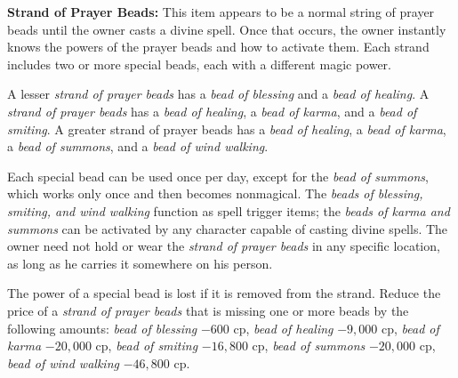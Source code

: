 \textbf{Strand of Prayer Beads:} This item appears to be a normal string of prayer beads until the owner casts a divine spell. Once that occurs, the owner instantly knows the powers of the prayer beads and how to activate them. Each strand includes two or more special beads, each with a different magic power.


A lesser \emph{strand of prayer beads} has a \emph{bead of blessing} and a \emph{bead of healing}. A \emph{strand of prayer beads} has a \emph{bead of healing}, a \emph{bead of karma}, and a \emph{bead of smiting}. A greater strand of prayer beads has a \emph{bead of healing}, a \emph{bead of karma}, a \emph{bead of summons}, and a \emph{bead of wind walking}.

Each special bead can be used once per day, except for the \emph{bead of summons}, which works only once and then becomes nonmagical. The \emph{beads of blessing, smiting, and wind walking} function as spell trigger items; the \emph{beads of karma and summons} can be activated by any character capable of casting divine spells. The owner need not hold or wear the \emph{strand of prayer beads} in any specific location, as long as he carries it somewhere on his person.

The power of a special bead is lost if it is removed from the strand. Reduce the price of a \emph{strand of prayer beads} that is missing one or more beads by the following amounts: \emph{bead of blessing} $-600$ cp, \emph{bead of healing} $-9,000$ cp, \emph{bead of karma} $-20,000$ cp, \emph{bead of smiting} $-16,800$ cp, \emph{bead of summons} $-20,000$ cp, \emph{bead of wind walking} $-46,800$ cp.

